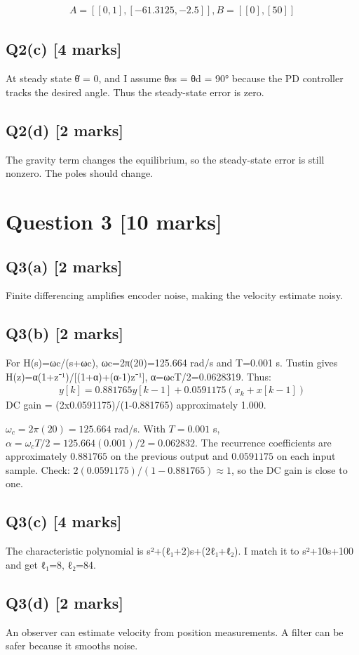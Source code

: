 \documentclass[11pt,a4paper]{article}
\begin{document}
\[\begin{aligned}A = [[0,1], [-61.3125,-2.5]], B = [[0],[50]]\end{aligned}\]

\subsection*{Q2(c) \hfill [4 marks]}

At steady state θ̇ = 0, and I assume θss = θd = 90° because the PD controller tracks the desired angle.
Thus the steady-state error is zero.

\subsection*{Q2(d) \hfill [2 marks]}

The gravity term changes the equilibrium, so the steady-state error is still nonzero.
The poles should change.

\section*{Question 3 \hfill [10 marks]}
\subsection*{Q3(a) \hfill [2 marks]}

Finite differencing amplifies encoder noise, making the velocity estimate noisy.

\subsection*{Q3(b) \hfill [2 marks]}

For H(s)=ωc/(s+ωc), ωc=2π(20)=125.664 rad/s and T=0.001 s.
Tustin gives H(z)=α(1+z⁻¹)/[(1+α)+(α-1)z⁻¹], α=ωcT/2=0.0628319.
Thus:\[\begin{aligned}y[k]=0.881765y[k-1]+0.0591175(x_k+x[k-1])\end{aligned}\]
DC gain = (2x0.0591175)/(1-0.881765) approximately 1.000.\par\smallskip $\omega_c=2\pi(20)=125.664$ rad/s. With $T=0.001$ s, $\alpha=\omega_cT/2=125.664(0.001)/2=0.062832$. The recurrence coefficients are approximately $0.881765$ on the previous output and $0.0591175$ on each input sample. Check: $2(0.0591175)/(1-0.881765)\approx1$, so the DC gain is close to one.

\subsection*{Q3(c) \hfill [4 marks]}

The characteristic polynomial is s²+(ℓ₁+2)s+(2ℓ₁+ℓ₂).
I match it to s²+10s+100 and get ℓ₁=8, ℓ₂=84.

\subsection*{Q3(d) \hfill [2 marks]}

An observer can estimate velocity from position measurements.
A filter can be safer because it smooths noise.
\end{document}
